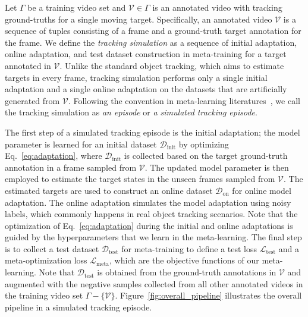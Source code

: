 \documentclass[letterpaper]{article} %
\def \datainit{\mathcal{D}_\text{init}}
\def \dataonline{\mathcal{D}_\text{on}}
\def \dataval{\mathcal{D}_\text{test}}
\def \thetainit{{\boldsymbol{\theta}_\text{init}^0}}
\def \thetainitadapt{\boldsymbol{\theta}_\text{init}}
\def \lossval{\mathcal{L}_\text{test}}
\def \lossmeta{\mathcal{L}_\text{meta}}
\begin{document}
Let $\Gamma$ be a training video set and $\mathcal{V} \in \Gamma$ is an annotated video with tracking ground-truths for a single moving target.
Specifically, an annotated video $\mathcal{V}$ is a sequence of tuples consisting of a frame and a ground-truth target annotation for the frame.
We define the \textit{tracking simulation} as a sequence of initial adaptation, online adaptation, and test dataset construction in meta-training for a target annotated in $\mathcal{V}$.
Unlike the standard object tracking, which aims to estimate targets in every frame, tracking simulation performs only a single initial adaptation and a single online adaptation on the datasets that are artificially generated from $\mathcal{V}$.
Following the convention in meta-learning literatures~\cite{santoro2016meta,finn2017model_agnostic}, we call the tracking simulation as \textit{an episode} or \textit{a simulated tracking episode}.

The first step of a simulated tracking episode is the initial adaptation; the model parameter is learned for an initial dataset $\datainit$ by optimizing Eq.~\eqref{eq:adaptation}, where $\datainit$ is collected based on the target ground-truth annotation in a frame sampled from $\mathcal{V}$.
The updated model parameter is then employed to estimate the target states in the unseen frames sampled from $\mathcal{V}$.
The estimated targets are used to construct an online dataset $\dataonline$ for online model adaptation.
The online adaptation simulates the model adaptation using noisy labels, which commonly happens in real object tracking scenarios.
Note that the optimization of Eq.~\eqref{eq:adaptation} during the initial and online adaptations is guided by the hyperparameters that we learn in the meta-learning.
The final step is to collect a test dataset $\dataval$ for meta-training to define a test loss $\lossval$ and a meta-optimization loss $\lossmeta$, which are the objective functions of our meta-learning.
Note that $\dataval$ is obtained from the ground-truth annotations in $\mathcal{V}$ and augmented with the negative samples collected from all other annotated videos in the training video set $\Gamma - \{\mathcal{V}\}$.
Figure~\ref{fig:overall_pipeline} illustrates the overall pipeline in a simulated tracking episode.
\end{document}

